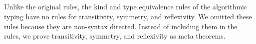 \begin{figure}
    \begin{center}
        \andalso
         \hfil
         \\[2mm]
         \\[2mm]
         \andalso
         \\[2mm]
         \\[2mm]
         \hfil
    \end{center}
    \label{fig:algorithmic-typing-rules}
\end{figure}




Unlike the original rules, the kind and type equivalence rules of the
algorithmic typing have no rules for transitivity, symmetry, and reflexivity.
We omitted these rules because they are non-syntax directed. Instead of
including them in the rules, we prove transitivity, symmetry, and reflexivity
as meta theorems.


